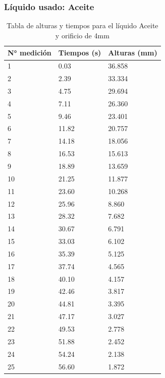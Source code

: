 \documentclass{article}
\begin{document}
\subsubsection{Líquido usado: Aceite}
\begin{table}[H]
    \begin{center}
        \begin{tabular}{ | m{2cm} | m{2cm} | m{2cm} | }
            \hline N° medición & Tiempos (s) & Alturas (mm) \\ 
            \hline 1 & 0.03 &  36.858 \\
            \hline 2 & 2.39 &  33.334 \\
            \hline 3 & 4.75 &  29.694 \\
            \hline 4 & 7.11 &  26.360 \\
            \hline 5 & 9.46 &  23.401 \\
            \hline 6 & 11.82 &  20.757 \\
            \hline 7 & 14.18 &  18.056 \\
            \hline 8 & 16.53 &  15.613 \\
            \hline 9 & 18.89 &  13.659 \\
            \hline 10 & 21.25 &  11.877 \\
            \hline 11 & 23.60 &  10.268 \\
            \hline 12 & 25.96 &  8.860 \\
            \hline 13 & 28.32 &  7.682 \\
            \hline 14 & 30.67 &  6.791 \\
            \hline 15 & 33.03 &  6.102 \\
            \hline 16 & 35.39 &  5.125 \\
            \hline 17 & 37.74 &  4.565 \\
            \hline 18 & 40.10 &  4.157 \\
            \hline 19 & 42.46 &  3.817 \\
            \hline 20 & 44.81 &  3.395 \\
            \hline 21 & 47.17 &  3.027 \\
            \hline 22 & 49.53 &  2.778 \\
            \hline 23 & 51.88 &  2.452 \\
            \hline 24 & 54.24 &  2.138 \\
            \hline 25 & 56.60 &  1.872 \\
            \hline
        \end{tabular}
    \end{center}
    \caption{Tabla de alturas y tiempos para el líquido Aceite y orificio de 4mm}
\end{table}
\end{document}
